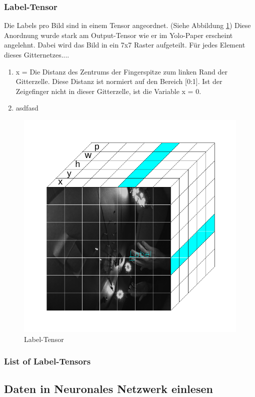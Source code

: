 \subsubsection{Label-Tensor}
Die Labels pro Bild sind in einem Tensor angeordnet. (Siehe Abbildung \ref{img:label_tensor})
Diese Anordnung wurde stark am Output-Tensor wie er im Yolo-Paper \cite{yolo} erscheint angelehnt.
Dabei wird das Bild in ein 7x7 Raster aufgeteilt.
Für jedes Element dieses Gitternetzes....
\begin{enumerate}
\item x = Die Distanz des Zentrums der Fingerspitze zum linken Rand der Gitterzelle. Diese Distanz ist normiert auf den Bereich [0:1]. Ist der Zeigefinger nicht in dieser Gitterzelle, ist die Variable x = 0.
\item asdfasd
\end{enumerate}
\begin{figure}	
	\centering
	\includegraphics[width=.8\textwidth]{Kapitel/DatenPipeline/Bilder/LabelTensor.pdf}
	\caption{Label-Tensor}
	\label{img:label_tensor}
\end{figure} 
\subsubsection{List of Label-Tensors}

\subsection{Daten in Neuronales Netzwerk einlesen}

